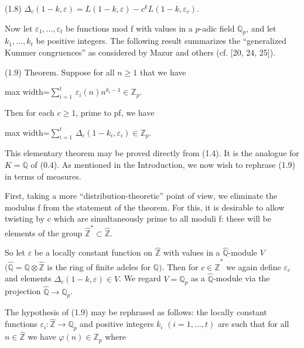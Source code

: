 \documentclass[11pt]{article}
\newcommand{\DFormula}[1]{\par\smallskip\noindent\begin{adjustbox}{max width=\linewidth}$\displaystyle #1$\end{adjustbox}\par\smallskip}
\begin{document}
\par
(1.8)  \(\Delta _{c}(1-k,\varepsilon )=L(1-k,\varepsilon )-c^{k}L(1-k,\varepsilon _{c})\).\par
\par
Now let \(\varepsilon _{1},...,\varepsilon _{t}\) be functions mod f with values in a \(p\)-adic field \(\mathbb{Q}_{p}\), and let \(k_{1},...,k_{t}\) be positive integers. The following result summarizes the “generalized Kummer congruences” as considered by Mazur and others (cf. [20, 24, 25]).\par
\par
(1.9) Theorem. Suppose for all \(n\geq 1\) that we have\par
\par
\DFormula{\sum _{i=1}^{t}\,\varepsilon _{i}(n)n^{k_{i}-1}\in \mathbb{Z}_{p}.}
\par
Then for each \(c\geq 1\), prime to pf, we have\par
\par
\DFormula{\sum _{i=1}^{t}\,\Delta _{c}(1-k_{i},\varepsilon _{i})\in \mathbb{Z}_{p}.}
\par
This elementary theorem may be proved directly from (1.4). It is the analogue for \(K=\mathbb{Q}\) of (0.4). As mentioned in the Introduction, we now wish to rephrase (1.9) in terms of measures.\par
\par
First, taking a more “distribution-theoretic” point of view, we eliminate the modulus f from the statement of the theorem. For this, it is desirable to allow twisting by c which are simultaneously prime to all moduli f: these will be elements of the group \(\widehat{\mathbb{Z}}^{\ast}\subset \widehat{\mathbb{Z}}\).\par
\par
So let \(\varepsilon \) be a locally constant function on \(\widehat{\mathbb{Z}}\) with values in a \(\widehat{\mathbb{Q}}\)-module \(V\) \((\widehat{\mathbb{Q}}=\mathbb{Q}\otimes \widehat{\mathbb{Z}}\) is the ring of finite adeles for \(\mathbb{Q})\). Then for \(c\in \widehat{\mathbb{Z}}^{\ast}\) we again define \(\varepsilon _{c}\) and elements \(\Delta _{c}(1-k,\varepsilon )\in V\). We regard \(V=\mathbb{Q}_{p}\) as a \(\widehat{\mathbb{Q}}\)-module via the projection \(\widehat{\mathbb{Q}}\to \mathbb{Q}_{p}\).\par
\par
The hypothesis of (1.9) may be rephrased as follows: the locally constant functions \(\varepsilon _{i}:\widehat{\mathbb{Z}}\to \mathbb{Q}_{p}\) and positive integers \(k_{i}\) \((i=1,...,t)\) are such that for all \(n\in \widehat{\mathbb{Z}}\) we have \(\varphi (n)\in \mathbb{Z}_{p}\) where\par
\end{document}
